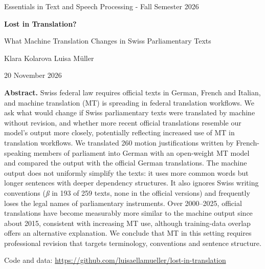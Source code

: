 \documentclass[11pt,a4paper]{article}
\begin{document}
\begin{titlepage}
\centering
{\large Essentials in Text and Speech Processing - Fall Semester 2026\par}
\vspace{2.5cm}
{\LARGE\bfseries Lost in Translation?\par}
\vspace{0.4cm}
{\Large What Machine Translation Changes in Swiss Parliamentary Texts\par}
\vspace{1.5cm}
{\large Klara Kolarova \quad Luisa M\"uller\par}
\vspace{0.4cm}
{\large 20 November 2026\par}
\vspace{1.8cm}
\begin{minipage}{0.86\textwidth}
\small
\noindent\textbf{Abstract.}
Swiss federal law requires official texts in German, French and Italian, and
machine translation (MT) is spreading in federal translation workflows. We ask
what would change if Swiss parliamentary texts were translated by machine
without revision, and whether more recent official translations resemble our model's output more closely, potentially reflecting increased use of MT in translation workflows. We translated 260 motion justifications written by French-speaking members of
parliament into German with an open-weight MT model and compared the output
with the official German translations. The machine output does not uniformly simplify the texts: it uses more common words but longer sentences with deeper dependency structures. It also ignores Swiss writing conventions (\emph{\ss} in 193 of 259
texts, none in the official versions) and frequently loses the legal names of
parliamentary instruments. Over 2000--2025, official translations have become
measurably more similar to the machine output since about 2015, consistent with
increasing MT use, although training-data overlap offers an alternative
explanation. We conclude that MT in this setting requires
professional revision that targets terminology, conventions and sentence
structure.
\end{minipage}
\vfill
{\small Code and data: \url{https://github.com/luisaellamueller/lost-in-translation}\par}
\end{titlepage}

\tableofcontents
\newpage
\end{document}
